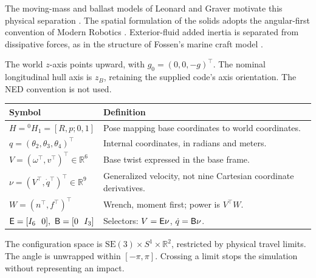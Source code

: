 \documentclass[11pt,a4paper]{article}
\newcommand{\R}{\mathbb R}\newcommand{\SE}{\mathrm{SE}(3)}
\begin{document}
The moving-mass and ballast models of Leonard and Graver motivate this
physical separation \cite{graver,leonard}. The spatial formulation of the
solids adopts the angular-first convention of Modern Robotics \cite{mr}.
Exterior-fluid added inertia is separated from dissipative forces, as in
the structure of Fossen's marine craft model \cite{fossen}.

The world \(z\)-axis points upward, with \(g_0=(0,0,-g)^\top\). The nominal
longitudinal hull axis is \(z_B\), retaining the supplied code's axis
orientation. The NED convention is not used.

\begin{tabularx}{\textwidth}{@{}lX@{}}\toprule
Symbol & Definition\\\midrule
\(H={}^{0}H_1=[R,p;0,1]\) & Pose mapping base coordinates to world coordinates.\\
\(q=(\theta_2,\theta_3,\theta_4)^\top\) & Internal coordinates, in radians and meters.\\
\(V=(\omega^\top,v^\top)^\top\in\R^6\) & Base twist expressed in the base frame.\\
\(\nu=(V^\top,\dot q^\top)^\top\in\R^9\) & Generalized velocity, not nine Cartesian coordinate derivatives.\\
\(W=(n^\top,f^\top)^\top\) & Wrench, moment first; power is \(V^\top W\).\\
\(\E=[I_6\ \ 0],\ \B=[0\ \ I_3]\) & Selectors: \(V=\mathsf E\nu\), \(\dot q=\mathsf B\nu\).\\\bottomrule
\end{tabularx}
The configuration space is \(\SE\times S^1\times\R^2\), restricted by
physical travel limits. The angle is unwrapped within \([-\pi,\pi]\).
Crossing a limit stops the simulation without representing an impact.
\clearpage
\end{document}
